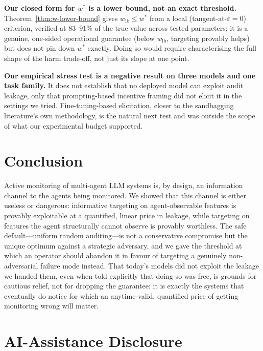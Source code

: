 \documentclass[sigconf,anonymous]{aamas}
\theoremstyle{plain}
\theoremstyle{definition}
\begin{document}
\textbf{Our closed form for $w^*$ is a lower bound, not an exact
threshold.} Theorem~\ref{thm:w-lower-bound} gives $w_{\mathrm{lb}} \le w^*$
from a local (tangent-at-$\varepsilon=0$) criterion, verified at
$83$--$91\%$ of the true value across tested parameters; it is a genuine,
one-sided operational guarantee (below $w_{\mathrm{lb}}$, targeting
provably helps) but does not pin down $w^*$ exactly. Doing so would require
characterising the full shape of the harm trade-off, not just its slope at
one point.

\textbf{Our empirical stress test is a negative result on three models and
one task family.} It does not establish that no deployed model can exploit
audit leakage, only that prompting-based incentive framing did not elicit it
in the settings we tried. Fine-tuning-based elicitation, closer to the
sandbagging literature's own methodology, is the natural next test and was
outside the scope of what our experimental budget supported.

\section{Conclusion}
\label{sec:conclusion}

Active monitoring of multi-agent LLM systems is, by design, an information
channel to the agents being monitored. We showed that this channel is either
useless or dangerous: informative targeting on agent-observable features is
provably exploitable at a quantified, linear price in leakage, while
targeting on features the agent structurally cannot observe is provably
worthless. The safe default---uniform random auditing---is not a
conservative compromise but the unique optimum against a strategic
adversary, and we gave the threshold at which an operator should abandon it
in favour of targeting a genuinely non-adversarial failure mode instead.
That today's models did not exploit the leakage we handed them, even when
told explicitly that doing so was free, is grounds for cautious relief, not
for dropping the guarantee: it is exactly the systems that eventually do
notice for which an anytime-valid, quantified price of getting monitoring
wrong will matter.

\section*{AI-Assistance Disclosure}
\label{sec:ai-disclosure}
\end{document}
